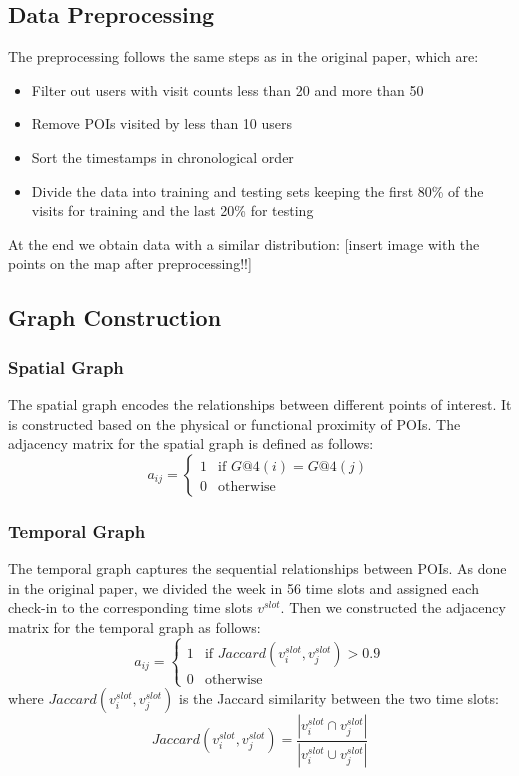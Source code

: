 \documentclass[twocolumn]{article}
\begin{document}
 \subsection{Data Preprocessing}
 The preprocessing follows the same steps as in the original paper, which are:
  \begin{itemize}
      \item Filter out users with visit counts less than 20 and more than 50
      \item Remove POIs visited by less than 10 users
      \item Sort the timestamps in chronological order
      \item Divide the data into training and testing sets keeping the first 80\% of the visits for training and the last 20\% for testing
  \end{itemize}
At the end we obtain data with a similar distribution:
[insert image with the points on the map after preprocessing!!]
\subsection{Graph Construction}
\subsubsection{Spatial Graph}
The spatial graph encodes the relationships between 
different points of interest. It is constructed based on the
 physical or functional proximity of POIs. The adjacency matrix 
 for the spatial graph is defined as follows:
  \begin{equation}
      a_{ij} = \begin{cases}
      1 & \text{if } G@4(i) = G@4(j) \\
      0 & \text{otherwise}
      \end{cases}
  \end{equation}
\subsubsection{Temporal Graph}
The temporal graph captures the sequential relationships between
  POIs. As done in the original paper,
  we divided the week in 56 time slots and assigned each check-in to
   the corresponding time slots $v^{slot}$. Then we constructed the adjacency matrix
    for the temporal graph as follows:
  \begin{equation}
      a_{ij} = \begin{cases}
      1 & \text{if } Jaccard(v^{slot}_i, v^{slot}_j) > 0.9 \\
      0 & \text{otherwise}
      \end{cases}
  \end{equation}
  where $Jaccard(v^{slot}_i, v^{slot}_j)$ is the Jaccard 
  similarity between the two time slots:
  \begin{equation}
      Jaccard(v^{slot}_i, v^{slot}_j) = \frac{|v^{slot}_i \cap v^{slot}_j|}{|v^{slot}_i \cup v^{slot}_j|}
  \end{equation}
\end{document}
